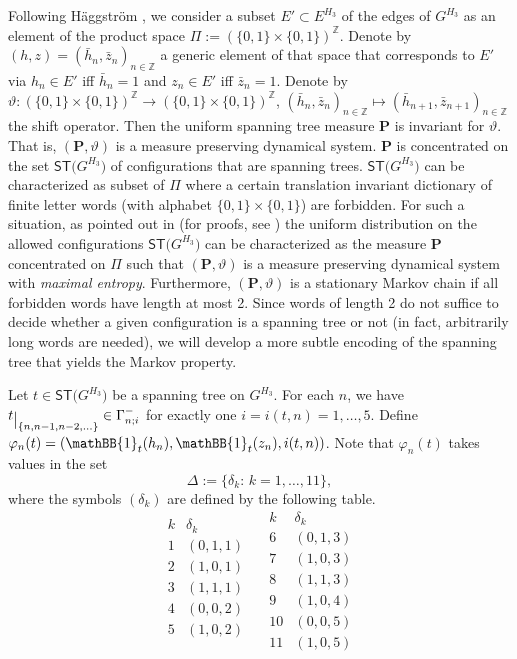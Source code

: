 \documentclass[11pt]{article}
\providecommand{\1}{\mathBB{1}}
\renewcommand{\P}{\mathbf{P}}
\newcommand{\Z}{{\mathbb{Z}}}
\newcommand{\vp}{\varphi}
\def\SPT{\mathsf{ST}}
\newcommand{\rest}[1]{\raisebox{-0.3em}{$\big|_{\scriptstyle
#1}$}}
\begin{document}
Following H\"{a}ggstr\"{o}m \cite{Haggstrom1994}, we consider a subset $E'\subset E^{H_3}$ of the edges of $G^{H_3}$ as an element of the product space $\Pi:=(\{0,1\}\times\{0,1\})^\Z$. Denote by $(h,z)=(\bar h_n,\bar z_n)_{n\in\Z}$ a generic element of that space that corresponds to $E'$ via $h_n\in E'$ iff $\bar h_n=1$ and $z_n\in E'$ iff $\bar z_n=1$. Denote by $\vartheta:(\{0,1\}\times\{0,1\})^\Z\to(\{0,1\}\times\{0,1\})^\Z$, $(\bar h_n,\bar z_n)_{n\in \Z}\mapsto (\bar h_{n+1},\bar z_{n+1})_{n\in\Z}$ the shift operator. Then the uniform spanning tree measure $\P$ is invariant for $\vartheta$. That is, $(\P,\vartheta)$ is a measure preserving dynamical system. $\P$ is concentrated on the set $\SPT\big(G^{H_3}\big)$ of configurations that are spanning trees. $\SPT\big(G^{H_3}\big)$ can be characterized as subset of $\Pi$ where a certain translation invariant dictionary of finite letter words (with alphabet $\{0,1\}\times\{0,1\}$) are forbidden. For such a situation, as pointed out in \cite[Theorems 2.4 and 2.5]{Haggstrom1994} (for proofs, see \cite{BurtonSteif1994,Haggstrom1995,Parry1964}) the uniform distribution on the allowed configurations $\SPT\big(G^{H_3}\big)$ can be characterized as the measure $\P$ concentrated on $\Pi$ such that $(\P,\vartheta)$ is a measure preserving dynamical system with \emph{maximal entropy}. Furthermore, $(\P,\vartheta)$ is a stationary Markov chain if all forbidden words have length at most 2. Since words of length 2 do not suffice to decide whether a given configuration is a spanning tree or not (in fact, arbitrarily long words are needed), we will develop a more subtle encoding of the spanning tree that yields the Markov property.

Let $t\in\SPT\big(G^{H_3}\big)$ be a spanning tree on $G^{H_3}$. For each $n$, we have $t\rest{\{n,n-1,n-2,\ldots\}}\in\Gamma^-_{n;i}$ for exactly one $i=i(t,n)=1,\ldots,5$. Define $\vp_n(t)=(\1_t(h_n),\1_t(z_n),i(t,n))$. Note that $\vp_n(t)$ takes values in the set
$$\Delta:=\{\delta_k:\,k=1,\ldots,11\},$$
where the symbols $(\delta_k)$ are defined by the following table.
\begin{equation}
\label{E6.01}
\begin{array}{c|c}
k&\delta_k\\\hline
1&(0,1,1)\\
2&(1,0,1)\\
3&(1,1,1)\\[2mm]
4&(0,0,2)\\
5&(1,0,2)\\
&
\end{array}
\quad
\begin{array}{r|c}
k&\delta_k\\\hline
6&(0,1,3)\\
7&(1,0,3)\\
8&(1,1,3)\\[2mm]
9&(1,0,4)\\[2mm]
10&(0,0,5)\\
11&(1,0,5)
\end{array}
\end{equation}
\end{document}
